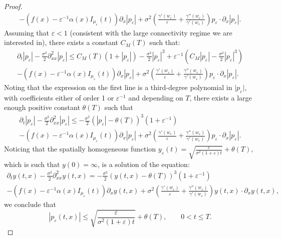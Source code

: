 \documentclass[10pt,a4paper]{amsart}
\newcommand{\eps}{\varepsilon}
\begin{document}
\begin{proof}
\begin{multline*}
-  \left( f(x)- \eps^{-1}\alpha(x) I_{\mu_\eps}(t)\right)\partial_x|p_\eps|
 + \sigma^2\left(\frac{\gamma'(w_\eps)}{\eps}+\frac{\gamma''(w_\eps)}{\gamma'(w_\eps)}\right) p_\eps \cdot\partial_x |p_\eps|.
\end{multline*}
Assuming that $\eps<1$ (consistent with the large connectivity regime we are interested in), there exists a constant $C_M(T)$ such that:
\begin{multline*}
\partial_t|p_\eps|-\frac{\sigma^2}{2}\partial^2_{xx}|p_\eps|
\leq C_M(T)(1+|p_\eps|)
- \frac{\sigma^2}2|p_\eps|^3
+\eps^{-1}\left(C_M|p_\eps|- \frac{\sigma^2}2 |p_\eps|^3\right)
\\
-  \left( f(x)- \eps^{-1}\alpha(x) I_{\mu_\eps}(t)\right)\partial_x|p_\eps|
 + \sigma^2\left(\frac{\gamma'(w_\eps)}{\eps}+\frac{\gamma''(w_\eps)}{\gamma'(w_\eps)}\right) p_\eps \cdot\partial_x |p_\eps|. 
\end{multline*}
Noting that the expression on the first line is a third-degree polynomial in $\vert p_\eps\vert$, with coefficients either of order 1 or $\eps^{-1}$ and depending on $T$, there exists a large enough positive constant $\theta(T)$ such that
\begin{multline*}
\partial_t|p_\eps|-\frac{\sigma^2}{2}\partial^2_{xx}|p_\eps|
\leq -\frac{\sigma^2}{2}\left(|p_\eps|-\theta(T)\right)^3(1+\eps^{-1})
\\
-  \left( f(x)- \eps^{-1}\alpha(x) I_{\mu_\eps}(t)\right)\partial_x|p_\eps|
 + \sigma^2\left(\frac{\gamma'(w_\eps)}{\eps}+\frac{\gamma''(w_\eps)}{\gamma'(w_\eps)}\right) p_\eps \cdot\partial_x |p_\eps|.
\end{multline*}
Noticing that the spatially homogeneous function $y_\eps(t) = \sqrt{\frac{\eps}{\sigma^2(1+\eps)t}}+\theta(T),$ which is such that $y(0)=\infty$, is a solution of the equation:
\begin{multline*}
\partial_ty(t,x)-\frac{\sigma^2}{2}\partial^2_{xx}y(t,x)
= -\frac{\sigma^2}{2}\left(y(t,x)-\theta(T)\right)^3(1+\eps^{-1})
\\
-  \left( f(x)- \eps^{-1}\alpha(x) I_{\mu_\eps}(t)\right)\partial_xy(t,x)
 + \sigma^2\left(\frac{\gamma'(w_\eps)}{\eps}+\frac{\gamma''(w_\eps)}{\gamma'(w_\eps)}\right) y(t,x) \cdot\partial_x y(t,x),
\end{multline*}
we conclude that 
\[
|p_\eps(t,x)|\leq  \sqrt{\frac{\eps}{\sigma^2(1+\eps)t}}+\theta(T),\qquad 0<t\leq T. 
\]
\end{proof}
\end{document}

